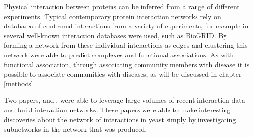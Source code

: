 Physical interaction between proteins can be inferred from a range of different experiments.
Typical contemporary protein interaction networks rely on databases of confirmed interactions from a variety of experiments, for example in \textcite{kenley_detecting_2011} several well-known interaction databases were used, such as BioGRID\autocite{stark_biogrid:_2006}. %
By forming a network from these individual interactions as edges and clustering this network \textcite{kenley_detecting_2011} were able to predict complexes and functional associations. %
As with functional association, through associating community members with disease it is possible to associate communities with diseases, as will be discussed in chapter \ref{methods}. %

Two papers, \textcite{ito_comprehensive_2001} and \textcite{uetz_comprehensive_2000}, were able to leverage large volumes of recent interaction data and build interaction networks. %
These papers were able to make interesting discoveries about the network of interactions in yeast simply by investigating subnetworks in the network that was produced.  %

